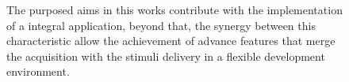 \begin{figure}
\begin{centering}

\par\end{centering}
\caption[Thesis contribution]{The purposed aims in this works contribute with the implementation of a integral application, beyond that, the synergy between this characteristic allow the achievement of advance features that merge the acquisition with the stimuli delivery in a flexible development environment.}
\label{fig:bci_system}
\end{figure}